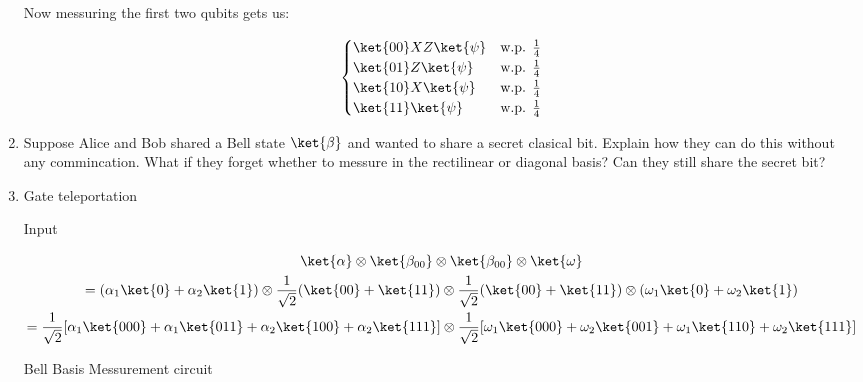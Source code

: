 \documentclass[]{article}
\begin{document}
\begin{enumerate}
        Now messuring the first two qubits gets us:

        \[ \begin{cases} 
          \ket{00} XZ\ket{\psi} & \text{w.p. } \frac{1}{4} \\
          \ket{01} Z\ket{\psi} & \text{w.p. } \frac{1}{4} \\
          \ket{10} X\ket{\psi} & \text{w.p. } \frac{1}{4} \\
          \ket{11} \ket{\psi} & \text{w.p. } \frac{1}{4} \\
          \end{cases}
        \]


      \item Suppose Alice and Bob shared a Bell state $\ket{\beta}$ and wanted to share a secret
        clasical bit. Explain how they can do this without any commincation. What if they forget whether
        to messure in the rectilinear or diagonal basis? Can they still share the secret bit?



      \item Gate teleportation

        Input

        \begin{gather*}
          \ket{\alpha} \otimes \ket{\beta_{00}} \otimes \ket{\beta_{00}} \otimes \ket{\omega}\\
          =(\alpha_1 \ket{0} + \alpha_2 \ket{1}) \otimes \frac{1}{\sqrt{2}}(\ket{00} + \ket{11})
          \otimes \frac{1}{\sqrt{2}}(\ket{00} + \ket{11}) \otimes (\omega_1 \ket{0} + \omega_2 \ket{1})\\
          =\frac{1}{\sqrt{2}}[\alpha_1 \ket{000} + \alpha_1 \ket{011} + \alpha_2 \ket{100} + \alpha_2 \ket{111}]
          \otimes \frac{1}{\sqrt{2}}[\omega_1 \ket{000} + \omega_2 \ket{001} + 
          \omega_1 \ket{110} + \omega_2 \ket{111}]\\
        \end{gather*}

        Bell Basis Messurement circuit


\end{enumerate}
\end{document}
